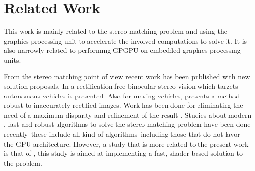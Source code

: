 \documentclass[conference]{IEEEtran}
\begin{document}


\section{Related Work}
This work is mainly related to the stereo matching problem and using the graphics processing unit to accelerate the involved computations to solve it. It is also narrowly related to performing GPGPU on embedded graphics processing units. %

From the stereo matching point of view recent work has been published with new solution proposals. In \cite{bin05} a rectification-free binocular stereo vision which targets autonomous vehicles is presented. Also for moving vehicles, \cite{unger11} presents a method robust to inaccurately rectified images. Work has been done for eliminating the need of a maximum disparity and refinement of the result \cite{unger09}. Studies about modern \cite{olofsson10}, fast and robust \cite{hong10} algorithms to solve the stereo matching problem have been done recently, these include all kind of algorithms--including those that do not favor the GPU architecture. However, a study that is more related to the present work is that of \cite{jonsson03}, this study is aimed at implementing a fast, shader-based solution to the problem. %
\end{document}

